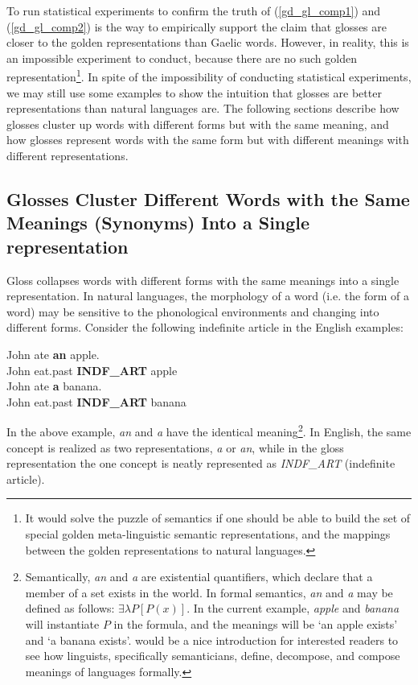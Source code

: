 \documentclass[final]{ua-thesis}
\numberwithin{equation}{section}
\begin{document}
To run statistical experiments to confirm the truth of (\ref{gd_gl_comp1}) and (\ref{gd_gl_comp2}) is the way to empirically support the claim that glosses are closer to the golden representations than Gaelic words. 
However, in reality, this is an impossible experiment to conduct, because there are no such golden representation\footnote{It would solve the puzzle of semantics if one should be able to build the set of special golden meta-linguistic semantic representations, and the mappings between the golden representations to natural languages.}.
In spite of the impossibility of conducting statistical experiments, we may still use some examples to show the intuition that glosses are better representations than natural languages are. The following sections describe how glosses cluster up words with different forms but with the same meaning, and how glosses represent words with the same form but with different meanings with different representations. 

\subsection{Glosses Cluster Different Words with the Same Meanings (Synonyms) Into a Single representation}\label{sec:cluster}
Gloss collapses words with different forms with the same meanings into a single representation. In natural languages, the morphology of a word (i.e. the form of a word) may be sensitive to the phonological environments and changing into different forms. Consider the following indefinite article in the English examples: 

\begin{exe}  
\ex \gll John ate \textbf{an} apple.\\
	John eat.past	\textbf{INDF\_ART} apple\\
\ex \gll John ate \textbf{a} banana.\\
	John eat.past   \textbf{INDF\_ART} banana\\
\end{exe}

In the above example, \textit{an} and \textit{a} have the identical meaning\footnote{Semantically, \textit{an} and \textit{a} are existential quantifiers, which declare that a member of a set exists in the world. In formal semantics, \textit{an} and \textit{a} may be defined as follows: $\exists\lambda P[P(x)]$. In the current example, \textit{apple} and \textit{banana} will instantiate $P$ in the formula, and the meanings will be `an apple exists' and `a banana exists'. \citet{kratzer1998semantics} would be a nice introduction for interested readers to see how linguists, specifically semanticians, define, decompose, and compose meanings of languages formally.}. 
In English, the same concept is realized as two representations, \textit{a} or \textit{an}, while in the gloss representation the one concept is neatly represented as \textit{INDF\_ART} (indefinite article). 
\end{document}
